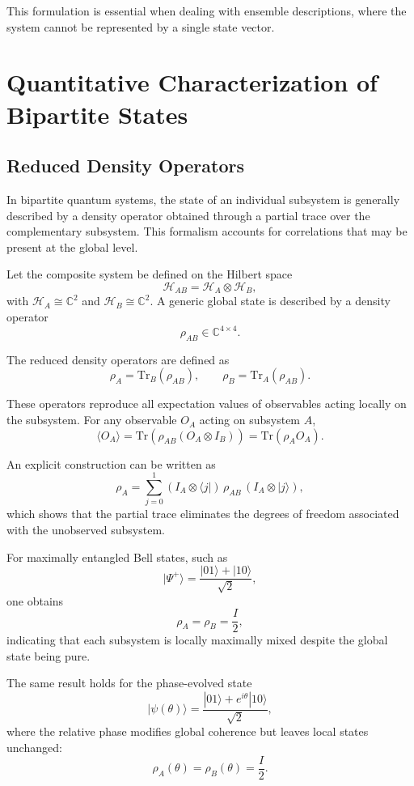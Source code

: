 \documentclass[a4paper]{article}
\begin{document}
This formulation is essential when dealing with ensemble descriptions, where the system cannot be represented by a single state vector.

\section{Quantitative Characterization of Bipartite States}

\subsection{Reduced Density Operators}

In bipartite quantum systems, the state of an individual subsystem is generally described by a density operator obtained through a partial trace over the complementary subsystem. This formalism accounts for correlations that may be present at the global level.

Let the composite system be defined on the Hilbert space
\[
\mathcal{H}_{AB} = \mathcal{H}_A \otimes \mathcal{H}_B,
\]
with $\mathcal{H}_A \cong \mathbb{C}^2$ and $\mathcal{H}_B \cong \mathbb{C}^2$. A generic global state is described by a density operator
\[
\rho_{AB} \in \mathbb{C}^{4 \times 4}.
\]

The reduced density operators are defined as
\[
\rho_A = \mathrm{Tr}_B(\rho_{AB}), \qquad
\rho_B = \mathrm{Tr}_A(\rho_{AB}).
\]

These operators reproduce all expectation values of observables acting locally on the subsystem. For any observable $O_A$ acting on subsystem $A$,
\[
\langle O_A \rangle = \mathrm{Tr}(\rho_{AB}(O_A \otimes I_B)) = \mathrm{Tr}(\rho_A O_A).
\]

An explicit construction can be written as
\[
\rho_A = \sum_{j=0}^{1} (I_A \otimes \langle j|)\,\rho_{AB}\,(I_A \otimes |j\rangle),
\]
which shows that the partial trace eliminates the degrees of freedom associated with the unobserved subsystem.

For maximally entangled Bell states, such as
\[
|\Psi^+\rangle = \frac{|01\rangle + |10\rangle}{\sqrt{2}},
\]
one obtains
\[
\rho_A = \rho_B = \frac{I}{2},
\]
indicating that each subsystem is locally maximally mixed despite the global state being pure.

The same result holds for the phase-evolved state
\[
|\psi(\theta)\rangle = \frac{|01\rangle + e^{i\theta}|10\rangle}{\sqrt{2}},
\]
where the relative phase modifies global coherence but leaves local states unchanged:
\[
\rho_A(\theta) = \rho_B(\theta) = \frac{I}{2}.
\]
\end{document}
